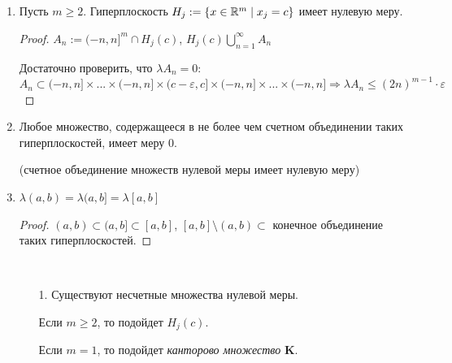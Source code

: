 \begin{enumerate}
    \begin{proof}
        $0=\lambda e = \inf \{\sum\limits_{n=1}^\infty \lambda_m P_n \mid e\subset \bigcup\limits_{j=1}^\infty P_j\text{ и }P_j\in \mathcal{P}^m_\Q \}\Rightarrow$

        $\Rightarrow$ можно выбрать $P_j\in \mathcal{P}^m_\Q$, Т.ч. $e\subset \bigcup\limits_{j=1}^\infty P_j$ и $\sum \lambda P_j < \varepsilon $

        Рассмотрим ячейку $P_1$, пусть $n=$НОК знаменателей длин ее сторон. Тогда $P_1$ можно разбить на кубические ячейки со стороной $\frac{1}{n}$.
    \end{proof}

    \item Пусть $m\geq 2$. Гиперплоскость $H_j:= \{x\in \mathbb{R}^m\mid x_j =c\}$ имеет нулевую меру.
    
    \begin{proof}
        $A_n:=(-n, n]^m\cap H_j(c)$, $H_j(c) \bigcup\limits_{n=1}^\infty A_n$

        Достаточно проверить, что $\lambda A_n =0$: $A_n\subset (-n, n]\times ...\times (-n, n] \times (c - \varepsilon, c]
        \times (-n, n]\times ...\times (-n, n]\Rightarrow \lambda A_n\leq (2n)^{m-1}\cdot \varepsilon$
    \end{proof}

    \item Любое множество, содержащееся в не более чем счетном объединении таких гиперплоскостей, имеет меру 0.
    
    (счетное объединение множеств нулевой меры имеет нулевую меру)
    
    \item $\lambda (a, b) =\lambda (a, b] = \lambda [a, b]$
    
    \begin{proof}
        $(a, b)\subset (a, b]\subset [a, b]$, $[a, b]\setminus (a, b) \subset$ конечное 
        объединение таких гиперплоскостей.
    \end{proof}

    \begin{remark}~
        \begin{enumerate}
            \item[1.] Существуют несчетные множества нулевой меры.
            
            Если $m\geq 2$, то подойдет $H_j(c)$.

            Если $m= 1$, то подойдет \textit{канторово множество} $\mathbf{K}$.


\end{enumerate}
\end{remark}
\end{enumerate}
